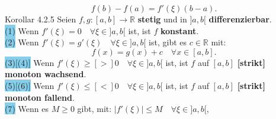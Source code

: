 \documentclass[landscape, 10pt]{article}
\newcommand{\R}{\mathbb{R}}
\begin{document}
\begin{multicols}{3}
\begin{equation*}
                            f(b)-f(a)=f'(\xi)(b-a).
                     \end{equation*}
              \colorbox{BurntOrange}{Korollar 4.2.5} 
                     Seien \textcolor{NavyBlue}{
                     $f,g:[a,b]\longrightarrow\R$}
                     \textbf{stetig} und in 
                     \textcolor{NavyBlue}{$]a,b[$} 
                     \textbf{differenzierbar}.\\
                     \colorbox{SkyBlue}{(1)} Wenn 
                            \textcolor{NavyBlue}{
                            $f'(\xi)=0\quad\forall\xi\in]a,b[$} 
                            ist, ist \textcolor{NavyBlue}{$f$} 
                            \textbf{konstant}.\\

                     \columnbreak
                     \colorbox{SkyBlue}{(2)} 
                            Wenn \textcolor{NavyBlue}{
                            $f'(\xi)=g'(\xi)\quad
                            \forall\xi\in]a,b[$} 
                            ist, gibt es 
                            \textcolor{NavyBlue}{$c\in\R$} mit: 
                            \begin{equation*}
                                   f(x)=g(x)+c\quad
                                   \forall x\in[a,b].
                            \end{equation*}
                     \colorbox{SkyBlue}{(3)[(4)]}
                            Wenn \textcolor{NavyBlue}{
                            $f'(\xi)\geqslant[>]0\quad
                            \forall\xi\in]a,b[$} ist, 
                            ist \textcolor{NavyBlue}{$f$} auf 
                            \textcolor{NavyBlue}{$[a,b]$} 
                            \textbf{[strikt] monoton wachsend}.\\
                     \colorbox{SkyBlue}{(5)[(6)]}
                            Wenn \textcolor{NavyBlue}{
                            $f'(\xi)\leqslant[<]0\quad
                            \forall\xi\in]a,b[$} ist, 
                            ist \textcolor{NavyBlue}{$f$} auf 
                            \textcolor{NavyBlue}{$[a,b]$} 
                            \textbf{[strikt] monoton fallend}.\\
                     \colorbox{SkyBlue}{(7)} Wenn es 
                            \textcolor{NavyBlue}{$M\geqslant0$} gibt, mit: 
                            \textcolor{NavyBlue}{
                            $|f'(\xi)|\leqslant M\quad
                            \forall\xi\in]a,b[$}, 

\end{multicols}
\end{document}
